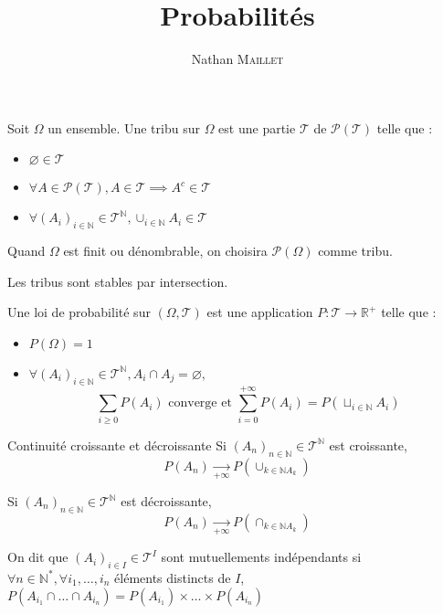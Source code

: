 \documentclass[french, a4paper, 10pt, twocolumn]{article}
\title{Probabilités}
\author{Nathan \textsc{Maillet}}
\date{}
\newcommand{\limit}[1]{\underset{#1}{\rightarrow}}  %
\newcommand{\N}{\mathbb{N}}   %
\newcommand{\R}{\mathbb{R}}   %
\begin{document}
\maketitle

\begin{definition}
    Soit \(\Omega\) un ensemble.
    Une tribu sur \(\Omega\) est une partie \(\mathcal{T}\) de \(\mathcal{P(T)}\) telle que :
        \begin{itemize}
            \item \(\varnothing \in \mathcal{T}\)
            \item \(\forall A \in \mathcal{P(T)}, A \in \mathcal{T} \implies A^c \in  \mathcal{T}\)
            \item \(\forall (A_i)_{i\in \N} \in \mathcal{T}^{\N}, \cup_{i\in \N}A_i \in \mathcal{T}\)
        \end{itemize}
    \tcblower
    Quand \(\Omega\) est finit ou dénombrable, on choisira \(\mathcal{P(\Omega)}\) comme tribu.

    Les tribus sont stables par intersection.
\end{definition}

\begin{definition}
    Une loi de probabilité sur $(\Omega,\mathcal{T})$ est une application \(P : \mathcal{T} \rightarrow \R^+\) telle que :
    \begin{itemize}
        \item \(P(\Omega)=1\)
        \item \(\forall (A_i)_{i\in \N} \in \mathcal{T}^{\N}, A_i\cap A_j =\varnothing,\)
        \[\sum_{i\geq 0}^{}P(A_i) \text{ converge et } \sum_{i=0}^{+\infty}P(A_i)=P(\sqcup_{i\in \N}A_i)\] 
    \end{itemize}
\end{definition}

\begin{theoreme}{Continuité croissante et décroissante}
    Si \((A_n)_{n\in \N} \in \mathcal{T}^{\N}\) est croissante, \[P(A_n)\limit{+\infty}P(\cup_{k\in \N A_k})\]
    
    Si \((A_n)_{n\in \N} \in \mathcal{T}^{\N}\) est décroissante, \[P(A_n)\limit{+\infty}P(\cap_{k\in \N A_k})\]
\end{theoreme}

\begin{definition}
    On dit que \((A_i)_{i \in I} \in \mathcal{T}^I\) sont mutuellements indépendants si \(\forall n \in \N^*, \forall i_1,\dots,i_n\)
    éléments distincts de \(I\), \(P(A_{i_1}\cap\dots\cap A_{i_n})=P(A_{i_1})\times\dots\times P(A_{i_n})\)
\end{definition}
\end{document}
